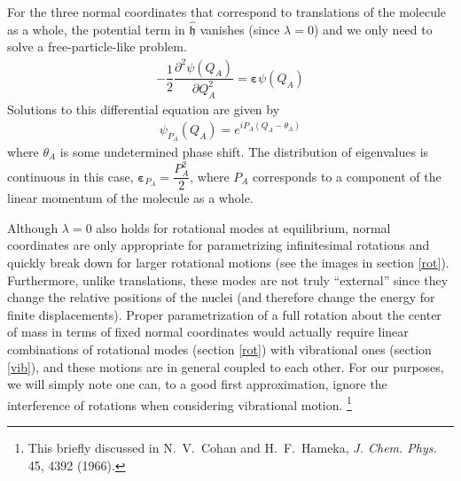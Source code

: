 \documentclass[11pt]{article}
\newcommand{\fr}[2]{\dfrac{#1}{#2}}
\newcommand{\pd}[3]{\ensuremath{ \dfrac{ \partial^{#1} #2 }{\partial #3 ^{#1}}}}
\newcommand{\op}[1]{\ensuremath{\hat{#1}}}
\newcommand{\y}{\ensuremath{\psi}}
\newcommand{\la}{\ensuremath{\lambda}}
\newcommand{\mf}[1]{\ensuremath{\mathfrak{#1}}}
\newcommand{\e}{\ensuremath{\bm\varepsilon}}
\begin{document}
For the three normal coordinates that correspond to translations of the molecule as a whole, the potential term in $\op{\mf{h}}$ vanishes (since $\la=0$) and we only need to solve a free-particle-like problem.
\begin{align}
-\fr{1}{2}
	\pd{2}{\y(Q_A)}{Q_A}
=
	\e
	\y(Q_A)
\end{align}
Solutions to this differential equation are given by
\begin{align}
	\y_{P_A}(Q_A)
=
	e^{iP_A(Q_A-\theta_A)}
\end{align}
where $\theta_A$ is some undetermined phase shift.
The distribution of eigenvalues is continuous in this case, $\e_{P_A}=\fr{P_A^2}{2}$, where $P_A$ corresponds to a component of the linear momentum of the molecule as a whole.

Although $\la=0$ also holds for rotational modes at equilibrium, normal coordinates are only appropriate for parametrizing infinitesimal rotations and quickly break down for larger rotational motions (see the images in section \ref{rot}).
Furthermore, unlike translations, these modes are not truly ``external'' since they change the relative positions of the nuclei (and therefore change the energy for finite displacements).
Proper parametrization of a full rotation about the center of mass in terms of fixed normal coordinates would actually require linear combinations of rotational modes (section \ref{rot}) with vibrational ones (section \ref{vib}), and these motions are in general coupled to each other.
For our purposes, we will simply note one can, to a good first approximation, ignore the interference of rotations when considering vibrational motion. \footnote{This briefly discussed in N.\ V.\ Cohan and H.\ F.\ Hameka, {\it J. Chem. Phys.} 45, 4392 (1966).}
\end{document}
